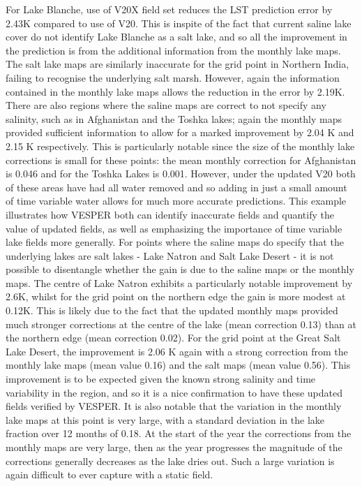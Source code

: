 \documentclass[hess, manuscript]{copernicus}
\begin{document}
For Lake Blanche, use of V20X field set reduces the LST prediction error by 2.43K compared to use of V20. This is inspite of the fact that current saline lake cover do not identify Lake Blanche as a salt lake, and so all the improvement in the prediction is from the additional information from the monthly lake maps. The salt lake maps are similarly inaccurate for the grid point in Northern India, failing to recognise the underlying salt marsh. However, again the information contained in the monthly lake maps allows the reduction in the error by 2.19K. There are also regions where the saline maps are correct to not specify any salinity, such as in Afghanistan and the Toshka lakes; again the monthly maps provided sufficient information to allow for a marked improvement by 2.04 K and 2.15 K respectively. This is particularly notable since the size of the monthly lake corrections is small for these points: the mean monthly correction for Afghanistan is 0.046 and for the Toshka Lakes is 0.001. However, under the updated V20 both of these areas have had all water removed and so adding in just a small amount of time variable water allows for much more accurate predictions. This example illustrates how VESPER both can identify inaccurate fields and quantify the value of updated fields, as well as emphasizing the importance of time variable lake fields more generally. For points where the saline maps do specify that the underlying lakes are salt lakes - Lake Natron and Salt Lake Desert - it is not possible to disentangle whether the gain is due to the saline maps or the monthly maps. The centre of Lake Natron exhibits a particularly notable improvement by 2.6K, whilst for the grid point on the northern edge the gain is more modest at 0.12K. This is likely due to the fact that the updated monthly maps provided much stronger corrections at the centre of the lake (mean correction 0.13) than at the northern edge (mean correction 0.02). For the grid point at the Great Salt Lake Desert, the improvement is 2.06 K again with a strong correction from the monthly lake maps (mean value 0.16) and the salt maps (mean value 0.56). This improvement is to be expected given the known strong salinity and time variability in the region, and so it is a nice confirmation to have these updated fields verified by VESPER. It is also notable that the variation in the monthly lake maps at this point is very large, with a standard deviation in the lake fraction over 12 months of 0.18. At the start of the year the corrections from the monthly maps are very large, then as the year progresses the magnitude of the corrections generally decreases as the lake dries out. Such a large variation is again difficult to ever capture with a static field.
\end{document}
